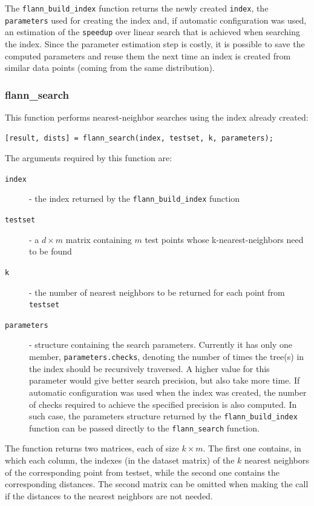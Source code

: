 \documentclass[letter,10pt]{article}
\begin{document}
The \texttt{flann\_build\_index} function returns the newly created
\texttt{index}, the \texttt{parameters} used for creating the index and, if
automatic configuration was used, an estimation of the \texttt{speedup}
over linear search that is achieved when searching the index.  Since the 
parameter estimation step is costly, it is
possible to save the computed parameters and reuse them the
next time an index is created from similar data points (coming from the
same distribution).




\subsubsection{flann\_search}

This function performs nearest-neighbor searches using the index already
created:
\begin{Verbatim}[fontsize=\footnotesize,frame=single]
[result, dists] = flann_search(index, testset, k, parameters);
\end{Verbatim}

The arguments required by this function are:
\begin{description}
\item[\texttt{index}] - the index returned by the
\texttt{flann\_build\_index} function
\item[\texttt{testset}] - a $d \times m$ matrix containing $m$ test points
whose k-nearest-neighbors need to be found
\item[\texttt{k}] - the number of nearest neighbors to be returned for each
point from \texttt{testset}
\item[\texttt{parameters}] - structure containing the search parameters.
Currently it has only one member, \texttt{parameters.checks}, denoting the
number of times the tree(s) in the index should be recursively traversed. A
higher value for this parameter would give better search precision, but
also take more time. If automatic configuration was used when the
index was created, the number of checks required to achieve the specified
precision is also computed. In such case, the parameters structure returned
by the \texttt{flann\_build\_index} function can be passed directly to the
\texttt{flann\_search} function.
\end{description}

The function returns two matrices, each of size $k \times m$. The first one contains, in which each column, the indexes (in the dataset matrix) of the $k$ nearest neighbors of the corresponding point from testset, while the second one contains the corresponding distances. The second matrix can be omitted when making the call if the distances to the nearest neighbors are not needed. 
\end{document}
